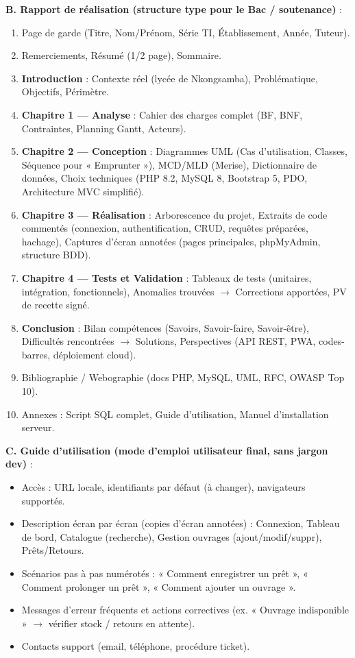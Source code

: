 \documentclass[11pt]{article}
\begin{document}
\begin{methode}
\textbf{B. Rapport de réalisation (structure type pour le Bac / soutenance)} :
\begin{enumerate}
\item Page de garde (Titre, Nom/Prénom, Série TI, Établissement, Année, Tuteur).
\item Remerciements, Résumé (1/2 page), Sommaire.
\item \textbf{Introduction} : Contexte réel (lycée de Nkongsamba), Problématique, Objectifs, Périmètre.
\item \textbf{Chapitre 1 — Analyse} : Cahier des charges complet (BF, BNF, Contraintes, Planning Gantt, Acteurs).
\item \textbf{Chapitre 2 — Conception} : Diagrammes UML (Cas d'utilisation, Classes, Séquence pour « Emprunter »), MCD/MLD (Merise), Dictionnaire de données, Choix techniques (PHP 8.2, MySQL 8, Bootstrap 5, PDO, Architecture MVC simplifié).
\item \textbf{Chapitre 3 — Réalisation} : Arborescence du projet, Extraits de code commentés (connexion, authentification, CRUD, requêtes préparées, hachage), Captures d'écran annotées (pages principales, phpMyAdmin, structure BDD).
\item \textbf{Chapitre 4 — Tests et Validation} : Tableaux de tests (unitaires, intégration, fonctionnels), Anomalies trouvées $\rightarrow$ Corrections apportées, PV de recette signé.
\item \textbf{Conclusion} : Bilan compétences (Savoirs, Savoir-faire, Savoir-être), Difficultés rencontrées $\rightarrow$ Solutions, Perspectives (API REST, PWA, codes-barres, déploiement cloud).
\item Bibliographie / Webographie (docs PHP, MySQL, UML, RFC, OWASP Top 10).
\item Annexes : Script SQL complet, Guide d'utilisation, Manuel d'installation serveur.
\end{enumerate}

\textbf{C. Guide d'utilisation (mode d'emploi utilisateur final, sans jargon dev)} :
\begin{itemize}
\item Accès : URL locale, identifiants par défaut (à changer), navigateurs supportés.
\item Description écran par écran (copies d'écran annotées) : Connexion, Tableau de bord, Catalogue (recherche), Gestion ouvrages (ajout/modif/suppr), Prêts/Retours.
\item Scénarios pas à pas numérotés : « Comment enregistrer un prêt », « Comment prolonger un prêt », « Comment ajouter un ouvrage ».
\item Messages d'erreur fréquents et actions correctives (ex. « Ouvrage indisponible » $\rightarrow$ vérifier stock / retours en attente).
\item Contacts support (email, téléphone, procédure ticket).
\end{itemize}
\end{methode}
\end{document}
